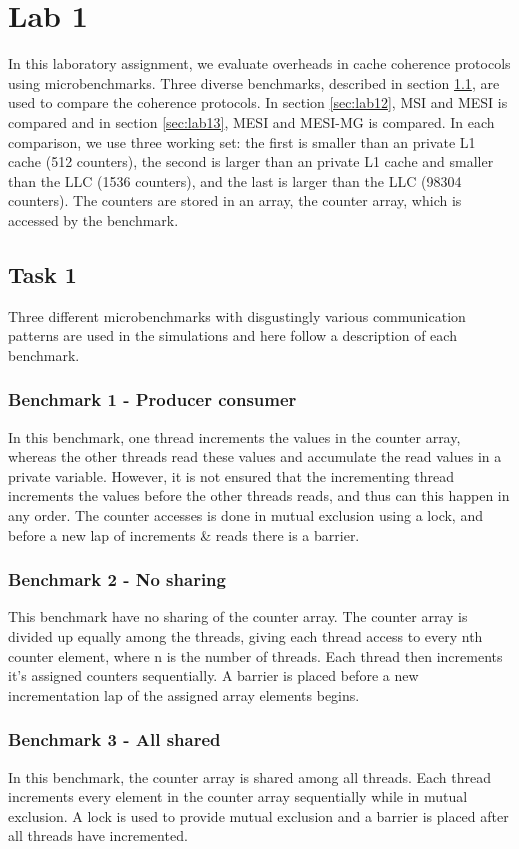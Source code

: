 \section{Lab 1}
\label{sec:lab1}
In this laboratory assignment, we evaluate overheads in cache coherence protocols using microbenchmarks. Three diverse benchmarks, described in section \ref{sec:lab11}, are used to compare the coherence protocols. In section \ref{sec:lab12}, MSI and MESI is compared and in section \ref{sec:lab13}, MESI and MESI-MG is compared. In each comparison, we use three working set: the first is smaller than an private L1 cache (512 counters), the second is larger than an private L1 cache and smaller than the LLC (1536 counters), and the last is larger than the LLC (98304 counters). The counters are stored in an array, the counter array, which is accessed by the benchmark.

\subsection{Task 1}
\label{sec:lab11}
Three different microbenchmarks with disgustingly various communication patterns are used in the simulations and here follow a description of each benchmark.
\subsubsection*{Benchmark 1 - Producer consumer}
In this benchmark, one thread increments the values in the counter array, whereas the other threads read these values and accumulate the read values in a private variable. However, it is not ensured that the incrementing thread increments the values before the other threads reads, and thus can this happen in any order. The counter accesses is done in mutual exclusion using a lock, and before a new lap of increments \& reads there is a barrier.

\subsubsection*{Benchmark 2 - No sharing}
This benchmark have no sharing of the counter array. The counter array is divided up equally among the threads, giving each thread access to every nth counter element, where n is the number of threads. Each thread then increments it's assigned counters sequentially. A barrier is placed before a new incrementation lap of the assigned array elements begins. 

\subsubsection*{Benchmark 3 - All shared}
In this benchmark, the counter array is shared among all threads. Each thread increments every element in the counter array sequentially while in mutual exclusion. A lock is used to provide mutual exclusion and a barrier is placed after all threads have incremented. 

